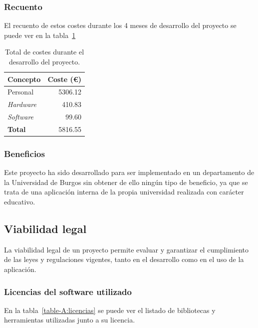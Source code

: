 \subsubsection{Recuento}
El recuento de estos costes durante los 4 meses de desarrollo del proyecto se puede ver en la tabla~\ref{table-A:economía}

\begin{table}
  \centering 
  \begin{tabular}{l r}
    \toprule
    \textbf{Concepto} & \textbf{Coste (€)} \\
    \midrule
    Personal & 5306.12 \\
	\textit{Hardware} & 410.83 \\
	\textit{Software} & 99.60\\
	\midrule
	\textbf{Total} & 5816.55 \\
	\bottomrule
  \end{tabular}
\caption{Total de costes durante el desarrollo del proyecto.}\label{table-A:economía}
\end{table}


\subsubsection{Beneficios}
Este proyecto ha sido desarrollado para ser implementado en un departamento de la Universidad de Burgos sin obtener de ello ningún tipo de beneficio, ya que se trata de una aplicación interna de la propia universidad realizada con carácter educativo.

\subsection{Viabilidad legal}
La viabilidad legal de un proyecto permite evaluar y garantizar el cumplimiento de las leyes y regulaciones vigentes, tanto en el desarrollo como en el uso de la aplicación.

\subsubsection{Licencias del software utilizado}

En la tabla~\ref{table-A:licencias} se puede ver el listado de bibliotecas y herramientas utilizadas junto a su licencia.

